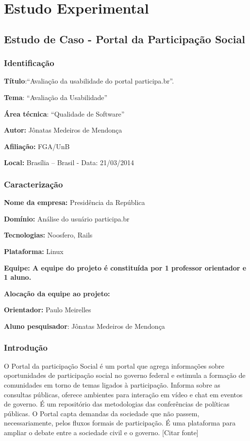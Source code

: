 \chapter{Estudo Experimental}

\section{Estudo de Caso - Portal da Participação Social}

\subsection{Identificação}

\textbf{Título}:“Avaliação da usabilidade do portal participa.br”.

\textbf{Tema}: “Avaliação da Usabilidade” 

\textbf{Área técnica}: “Qualidade de Software” 

\textbf{Autor:} Jônatas Medeiros de Mendonça  

\textbf{Afiliação:} FGA/UnB 

\textbf{Local:} Brasília – Brasil - Data:  21/03/2014 

\subsection{Caracterização}

\textbf{Nome da empresa:} Presidência da República

\textbf{Domínio:} Análise do usuário participa.br

\textbf{Tecnologias:} Noosfero, Rails 

\textbf{Plataforma:} Linux 

\textbf{Equipe: A equipe do projeto é constituída por 1 professor orientador e 1 aluno.} 

\textbf{Alocação da equipe ao projeto:} 

\textbf{Orientador:} Paulo Meirelles

\textbf{Aluno pesquisador}: Jônatas Medeiros de Mendonça


\subsection{Introdução}

O Portal da participação Social é um portal que agrega informações sobre oportunidades de participação social no governo federal e estimula a formação de comunidades em torno de temas ligados à participação. Informa sobre as consultas públicas, oferece ambientes para interação em vídeo e chat em eventos de governo. É um repositório das metodologias das conferências de políticas públicas. O Portal capta demandas da sociedade que não passem, necessariamente, pelos fluxos formais de participação. É uma plataforma para ampliar o debate entre a sociedade civil e o governo. [Citar fonte]


